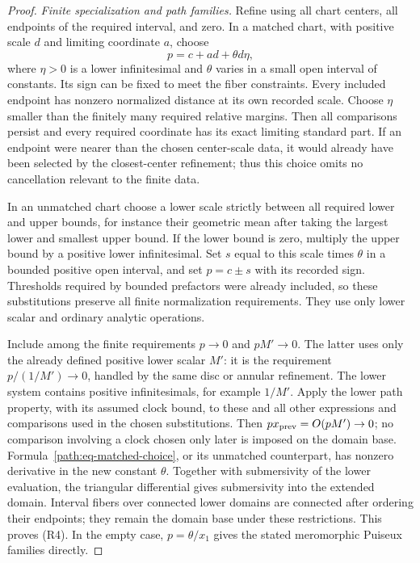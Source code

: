 \begin{proof}
\emph{Finite specialization and path families.}
Refine using all chart centers, all endpoints of the required interval,
and zero.  In a matched chart, with positive scale \(d\) and limiting
coordinate \(a\), choose
\begin{equation}\label{path:eq-matched-choice}
 p=c+ad+\theta d\eta,
\end{equation}
where \(\eta>0\) is a lower infinitesimal and \(\theta\) varies in a
small open interval of constants.  Its sign can be fixed to meet the
fiber constraints.  Every included endpoint has nonzero normalized
distance at its own recorded scale.  Choose \(\eta\) smaller than
the finitely many required relative margins.  Then all comparisons
persist and every required coordinate has its exact limiting standard
part.  If an endpoint were nearer than the chosen center-scale data,
it would already have been selected by the closest-center refinement;
thus this choice omits no cancellation relevant to the finite data.

In an unmatched chart choose a lower scale strictly between all
required lower and upper bounds, for instance their geometric mean
after taking the largest lower and smallest upper bound.  If the lower
bound is zero, multiply the upper bound by a positive lower
infinitesimal.  Set \(s\) equal to this scale times \(\theta\) in a
bounded positive open interval, and set \(p=c\pm s\) with its recorded
sign.  Thresholds required by bounded prefactors were already included,
so these substitutions preserve all finite normalization requirements.
They use only lower scalar and ordinary analytic operations.

Include among the finite requirements \(p\to0\) and \(pM'\to0\).
The latter uses only the already defined positive lower scalar
\(M'\): it is the requirement \(p/(1/M')\to0\), handled by the
same disc or annular refinement.  The lower system contains positive
infinitesimals, for example \(1/M'\).  Apply the lower path property,
with its assumed clock bound, to these and all other expressions and
comparisons used in the chosen substitutions.  Then
\(px_{\rm prev}=O(pM')\to0\); no comparison involving a clock
chosen only later is imposed on the domain base.
Formula~\eqref{path:eq-matched-choice}, or
its unmatched counterpart, has nonzero derivative in the new constant
\(\theta\).  Together with submersivity of the lower evaluation,
the triangular differential gives submersivity into the extended
domain.  Interval fibers over connected lower domains are connected
after ordering their endpoints; they remain the domain base under
these restrictions.  This proves \textup{(R4)}.  In the empty case,
  \(p=\theta/x_1\) gives the stated meromorphic Puiseux families directly.
\end{proof}

